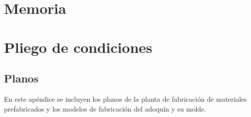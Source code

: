 \documentclass[12pt,titlepage,openright]{report}
\begin{document}
\renewcommand\listtablename{Índice de tablas}
\renewcommand\tablename{Tabla}



 \tableofcontents \newpage \listoffigures
\newpage \listoftables \newpage {}


\cleardoublepage

\part*{Memoria}



\cleardoublepage

\part*{Pliego de condiciones}

\cleardoublepage

\appendix
\chapter{Planos}\label{aped.A}
En este apéndice se incluyen los planos de la planta de fabricación de materiales prefabricados y los modelos de fabricación del adoquín y su molde.
\cleardoublepage


\end{document}
